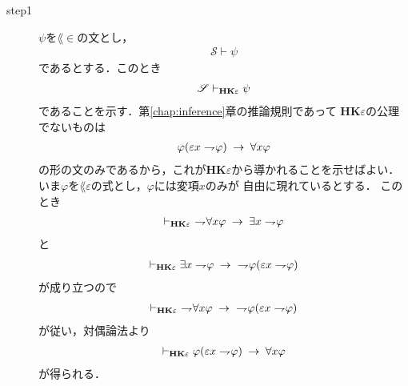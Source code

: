 \begin{description}
		\item[step1]
			$\psi$を$\lang{\in}$の文とし，
			\begin{align}
				\mathscr{S} \vdash \psi
			\end{align}
			であるとする．このとき
			\begin{align}
				\mathscr{S} \vdash_{{\scriptsize \mbox{{\bf HK$\varepsilon$}}}} \psi
			\end{align}
			であることを示す．第\ref{chap:inference}章の推論規則であって
			{\bf HK$\varepsilon$}の公理でないものは
			\begin{align}
				\varphi(\varepsilon x \rightharpoondown\hspace{-0.25em} \varphi) \hspace{0.25em}\rightarrow\hspace{0.25em} \forall x \varphi
			\end{align}
			の形の文のみであるから，これが{\bf HK$\varepsilon$}から導かれることを示せばよい．
			いま$\varphi$を$\lang{\varepsilon}$の式とし，$\varphi$には変項$x$のみが
			自由に現れているとする．
			このとき
			\begin{align}
				\vdash_{{\scriptsize \mbox{{\bf HK$\varepsilon$}}}}
				\ \rightharpoondown\hspace{-0.25em} \forall x \varphi \hspace{0.25em}\rightarrow\hspace{0.25em} \exists x \rightharpoondown\hspace{-0.25em} \varphi
			\end{align}
			と
			\begin{align}
				\provable{\mbox{{\bf HK$\varepsilon$}}}
				\exists x \negation \varphi \rarrow\ 
				\negation \varphi(\varepsilon x \negation \varphi)
			\end{align}
			が成り立つので
			\begin{align}
				\provable{\mbox{{\bf HK$\varepsilon$}}}
				\ \negation \forall x \varphi \rarrow\ 
				\negation \varphi(\varepsilon x \negation \varphi)
			\end{align}
			が従い，対偶論法より
			\begin{align}
				\vdash_{{\scriptsize \mbox{{\bf HK$\varepsilon$}}}}
				\varphi(\varepsilon x \rightharpoondown\hspace{-0.25em} \varphi) \hspace{0.25em}\rightarrow\hspace{0.25em} \forall x \varphi
			\end{align}
			が得られる．
			

\end{description}
